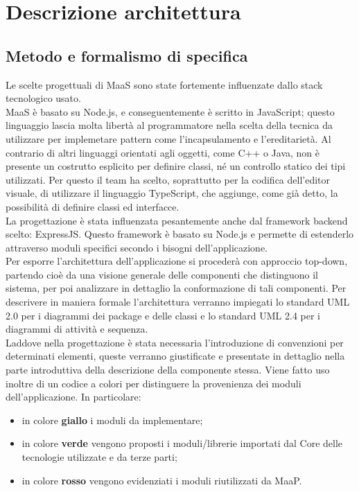 \newpage
\section{Descrizione architettura}
\subsection{Metodo e formalismo di specifica}
Le scelte progettuali di MaaS sono state fortemente influenzate dallo stack tecnologico usato. \\
MaaS è basato su Node.js, e conseguentemente è scritto in JavaScript; questo linguaggio lascia molta libertà al programmatore nella scelta della tecnica da utilizzare per implemetare pattern come l'incapsulamento e l'ereditarietà. Al contrario di altri linguaggi orientati agli oggetti, come C++ o Java, non è presente un costrutto esplicito per definire classi, né un controllo statico dei tipi utilizzati. Per questo il team ha scelto, soprattutto per la codifica dell'editor visuale, di utilizzare il linguaggio TypeScript, che aggiunge, come già detto, la possibilità di definire classi ed interfacce. \\
La progettazione è stata influenzata pesantemente anche dal framework backend scelto: ExpressJS. Questo framework è basato su Node.js e permette di estenderlo attraverso moduli specifici secondo i bisogni dell'applicazione. \\
Per esporre l'architettura dell'applicazione si procederà con approccio top-down, partendo cioè da una visione generale delle componenti che distinguono il sistema, per poi analizzare in dettaglio la conformazione di tali componenti. Per descrivere in maniera formale l'architettura verranno impiegati lo standard UML 2.0 per i diagrammi dei package e delle classi e lo standard UML 2.4 per i diagrammi di attività e sequenza. \\
Laddove nella progettazione è stata necessaria l'introduzione di convenzioni per determinati elementi, queste verranno giustificate e presentate in dettaglio nella parte introduttiva della descrizione della componente stessa.
Viene fatto uso inoltre di un codice a colori per distinguere la provenienza dei moduli dell'applicazione. In particolare:
\begin{itemize}
\item in colore \textbf{giallo} i moduli da implementare;
\item in colore \textbf{verde} vengono proposti i moduli/librerie importati dal Core delle tecnologie utilizzate e da terze parti;
\item in colore \textbf{rosso} vengono evidenziati i moduli riutilizzati da MaaP.
\end{itemize}
